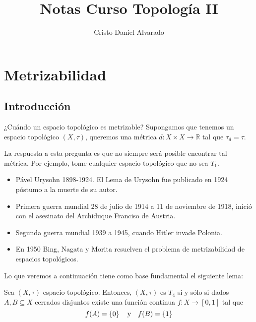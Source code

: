 \documentclass[12pt]{report}
\theoremstyle{largebreak}
\newcommand\cf[3]{\ensuremath{#1:#2\rightarrow#3}}
\begin{document}
    \setlength{\parskip}{5pt} %
    \setlength{\parindent}{12pt} %
    \title{Notas Curso Topología II}
    \author{Cristo Daniel Alvarado}
    \maketitle

    \tableofcontents %

    
    \chapter{Metrizabilidad}
    
    \section{Introducción}
    
    ¿Cuándo un espacio topológico es metrizable? Supongamos que tenemos un espacio topológico $(X,\tau)$, queremos una métrica $\cf{d}{X\times X}{\mathbb{R}}$ tal que $\tau_d=\tau$.

    La respuesta a esta pregunta es que no siempre será posible encontrar tal métrica. Por ejemplo, tome cualquier espacio topológico que no sea $T_1$.

    \begin{itemize}
        \item Pável Urysohn 1898-1924. El Lema de Urysohn fue publicado en 1924 póstumo a la muerte de su autor.
        \item Primera guerra mundial 28 de julio de 1914 a 11 de noviembre de 1918, inició con el asesinato del Archiduque Franciso de Austria.
        \item Segunda guerra mundial 1939 a 1945, cuando Hitler invade Polonia.
        \item En 1950 Bing, Nagata y Morita resuelven el problema de metrizabilidad de espacios topológicos.
    \end{itemize}

    Lo que veremos a continuación tiene como base fundamental el siguiente lema:

    \begin{lema}
        Sea $(X,\tau)$ espacio topológico. Entonces, $(X,\tau)$ es $T_4$ si y sólo si dados $A,B\subseteq X$ cerrados disjuntos existe una función continua $\cf{f}{X}{[0,1]}$ tal que
        \begin{equation*}
            f(A)=\left\{0\right\} \quad\textup{y}\quad f(B)=\left\{1\right\}
        \end{equation*}
    \end{lema}
\end{document}
